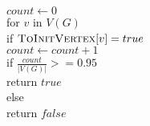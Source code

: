 \documentclass[11pt]{article}
\begin{document}
\begin{itemize}
\begin{algo}
\\						
\\		$count \gets 0$
\\		for $v$ in $V(G)$\+
\\			if $\textsc{ToInitVertex}[v] = true$\+
\\				$count \gets count + 1$\- \-
\\		if $\frac{count}{|V(G)|} >= 0.95$\+
\\			return $true$\-
\\		else\+
\\			return $false$
\\
\\[0.5ex]
\end{algo}

	
\end{itemize}
\end{document}
